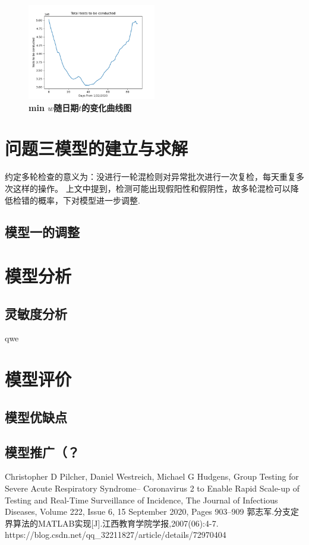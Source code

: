 \documentclass[withoutpreface,bwprint]{cumcmthesis} %
\begin{document}
\begin{figure}[H]
\centering
\includegraphics[width=0.5\textwidth]{nyc_total_tests_to_be_conducted.png}
\caption{\textbf{\rm{min} $w$随日期$t$的变化曲线图}}
\label{pro1}
\end{figure}


\section{问题三模型的建立与求解}
约定多轮检查的意义为：没进行一轮混检则对异常批次进行一次复检，每天重复多次这样的操作。
上文中提到，检测可能出现假阳性和假阴性，故多轮混检可以降低检错的概率，下对模型进一步调整.
\subsection{模型一的调整}

\section{模型分析}
\subsection{灵敏度分析}
qwe

\section{模型评价}
\subsection{模型优缺点}

\subsection{模型推广（？}


\newpage

\begin{thebibliography}{100}
Christopher D Pilcher, Daniel Westreich, Michael G Hudgens, Group Testing for Severe Acute Respiratory Syndrome– Coronavirus 2 to Enable Rapid Scale-up of Testing and Real-Time Surveillance of Incidence, The Journal of Infectious Diseases, Volume 222, Issue 6, 15 September 2020, Pages 903–909
郭志军.分支定界算法的MATLAB实现[J].江西教育学院学报,2007(06):4-7.
https://blog.csdn.net/qq\_32211827/article/details/72970404
\end{thebibliography}
\end{document}
